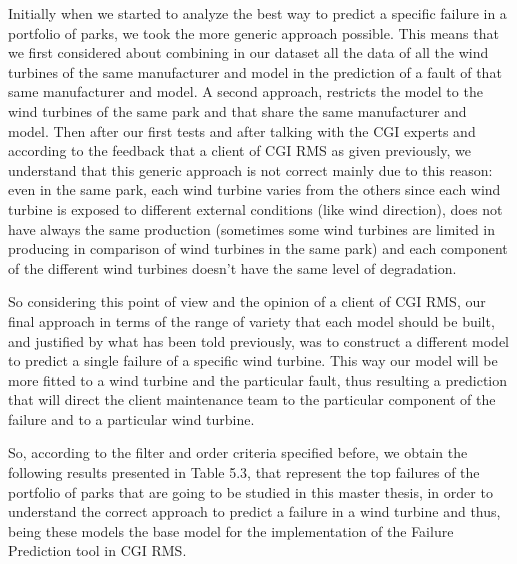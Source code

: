Initially when we started to analyze the best way to predict a specific failure in a portfolio of parks, we took the more generic approach possible. This means that we first considered about combining in our dataset all the data of all the wind turbines of the same manufacturer and model in the prediction of a fault of that same manufacturer and model. A second approach, restricts the model to the wind turbines of the same park and that share the same manufacturer and model. Then after our first tests and after talking with the CGI experts and according to the feedback that a client of CGI RMS as given previously, we understand that this generic approach is not correct mainly due to this reason: even in the same park, each wind turbine varies from the others since each wind turbine is exposed to different external conditions (like wind direction), does not have always the same production (sometimes some wind turbines are limited in producing in comparison of wind turbines in the same park) and each component of the different wind turbines doesn't have the same level of degradation. 


So considering this point of view and the opinion of a client of CGI RMS, our final approach in terms of the range of variety that each model should be built, and justified by what has been told previously, was to construct a different model to predict a single failure of a specific wind turbine. This way our model will be more fitted to a wind turbine and the particular fault, thus resulting a prediction that will direct the client maintenance team to the particular component of the failure and to a particular wind turbine.

So, according to the filter and order criteria specified before, we obtain the following results presented in Table 5.3, that represent the top failures of the portfolio of parks that are going to be studied in this master thesis, in order to understand the correct approach to predict a failure in a wind turbine and thus, being these models the base model for the implementation of the Failure Prediction tool in CGI RMS.

